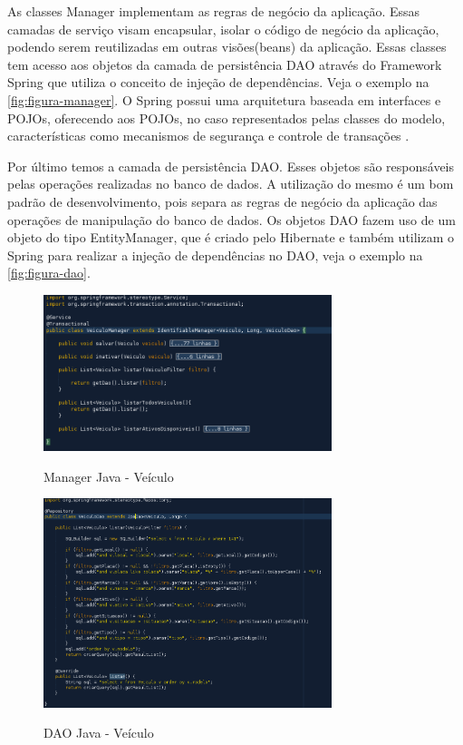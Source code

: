 As classes Manager implementam as regras de negócio da aplicação. Essas camadas de serviço visam encapsular, isolar o código de negócio da aplicação, podendo serem reutilizadas em outras visões(beans) da aplicação. Essas classes tem acesso aos objetos da camada de persistência DAO através do Framework Spring que utiliza o conceito de injeção de dependências. Veja o exemplo na \autoref{fig:figura-manager}. 
O Spring possui uma arquitetura baseada em interfaces e POJOs, oferecendo aos POJOs, no caso representados pelas classes do modelo, características como mecanismos de segurança e controle de transações \cite{WikipediaSpring2017}. 

Por último temos a camada de persistência DAO. Esses objetos são responsáveis pelas operações realizadas no banco de dados. A utilização do mesmo é um bom padrão de desenvolvimento, pois separa as regras de negócio da aplicação das operações de manipulação do banco de dados. Os objetos DAO fazem uso de um objeto do tipo EntityManager, que é criado pelo Hibernate e também utilizam o Spring para realizar a injeção de dependências no DAO, veja o exemplo na \autoref{fig:figura-dao}. 

\begin{figure}[!htb]
    \centering
    \caption{Manager Java - Veículo}
    \includegraphics[width=0.75\textwidth]{dados/figuras/manager.png}
    \label{fig:figura-manager}
\end{figure}

\begin{figure}[!htb]
    \centering
    \caption{DAO Java - Veículo}
    \includegraphics[width=0.75\textwidth]{dados/figuras/dao.png}
    \label{fig:figura-dao}
\end{figure}


